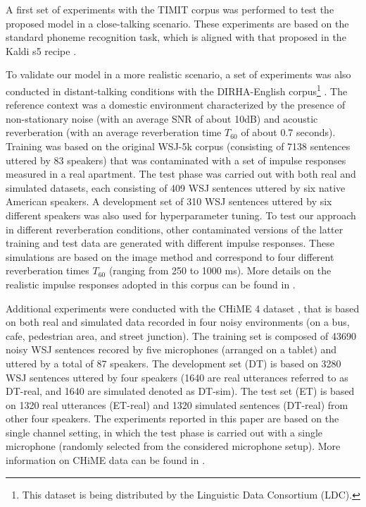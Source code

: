 \documentclass[journal]{IEEEtran}
\begin{document}
A first set of experiments with the TIMIT corpus was performed to test the proposed model in a close-talking scenario. These experiments are based on the standard phoneme recognition task, which is aligned with that proposed in the Kaldi s5 recipe \cite{kaldi}.

To validate our model in a more realistic scenario, a set of experiments was also conducted in distant-talking conditions  with the DIRHA-English corpus\footnote{This dataset is being distributed by the Linguistic Data Consortium (LDC).} \cite{dirha_asru}. The reference context was a domestic environment characterized by the presence of non-stationary noise (with an average SNR of about 10dB) and acoustic reverberation (with an average reverberation time $T_{60}$ of about 0.7 seconds).
Training was based on the original WSJ-5k corpus (consisting of 7138 sentences uttered by 83 speakers) that was contaminated with a set of impulse responses measured in a real apartment.
The test phase was carried out with both real and simulated datasets, each consisting of 409 WSJ sentences uttered by six native American speakers. A development set of 310 WSJ sentences uttered by six different speakers was also used for hyperparameter tuning.
To test our approach in different reverberation conditions, other contaminated versions of the latter training and test data are generated with different impulse responses. These simulations are based on the image method \cite{image} and correspond to four different reverberation times $T_{60}$ (ranging from 250 to 1000 ms). More details on the realistic impulse responses adopted in this corpus can be found in \cite{rav_is16,ravanelli_eusipco2012,rav_in14}.

Additional experiments were conducted with the CHiME 4 dataset \cite{chime4_paper}, that is based on both real and simulated data recorded in four noisy environments (on a bus, cafe, pedestrian area, and street junction). The training set is composed of 43690 noisy WSJ sentences recored by five microphones (arranged on a tablet) and uttered by a total of 87 speakers. The development set (DT) is based on 3280 WSJ sentences uttered by four speakers (1640 are real utterances referred to as DT-real, and 1640 are simulated denoted as DT-sim). 
The test set (ET) is based on  1320 real utterances (ET-real) and 1320 simulated sentences (DT-real) from other four speakers. The experiments reported in this paper are based on the single channel setting, in which the test phase is carried out with a single microphone (randomly selected from the considered microphone setup). 
More information on CHiME data can be found in \cite{chime3}.
\end{document}
